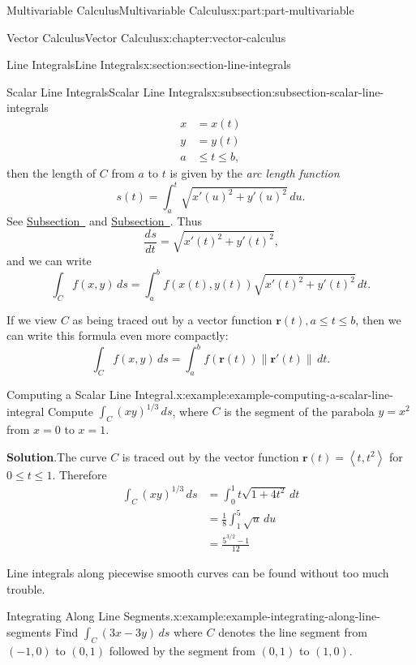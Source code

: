 \documentclass[twoside,10pt,]{book}
\newcommand{\blocktitlefont}{\relax}
\numberwithin{equation}{part}
\newcommand{\vb}[1]{\mathbf{#1}}
\newcommand{\dv}[3][]{\dfrac{d^{#1} #2}{d #3^{#1}}}
\newcommand{\norm}[1]{\left\| #1 \right\|}
\newcommand{\dotprod}[1]{\left\langle #1 \right\rangle}
\newcommand{\amp}{&}
\begin{document}
\begin{partptx}{Multivariable Calculus}{}{Multivariable Calculus}{}{}{x:part:part-multivariable}
\begin{chapterptx}{Vector Calculus}{}{Vector Calculus}{}{}{x:chapter:vector-calculus}
\begin{sectionptx}{Line Integrals}{}{Line Integrals}{}{}{x:section:section-line-integrals}
\begin{subsectionptx}{Scalar Line Integrals}{}{Scalar Line Integrals}{}{}{x:subsection:subsection-scalar-line-integrals}
\begin{align*}
x \amp = x(t) \\
y \amp = y(t) \\
a \amp \leq t\leq b \text{,}
\end{align*}
then the length of \(C\) from \(a\) to \(t\) is given by the \emph{arc length function}%
\begin{equation*}
s(t) = \int_{a}^{t}\sqrt{x'(u)^{2} + y'(u)^{2}}\,du\text{.}
\end{equation*}
See \hyperref[x:subsection:subsection-arc-length-parametric-curves]{Subsection~} and \hyperref[x:subsection:subsection-arc-length]{Subsection~}. Thus%
\begin{equation*}
\dv{s}{t} = \sqrt{x'(t)^{2} + y'(t)^{2}}\text{,}
\end{equation*}
and we can write%
\begin{equation*}
\int_{C}f(x,y)\,ds = \int_{a}^{b}f(x(t),y(t))\sqrt{x'(t)^{2} + y'(t)^{2}}\,dt\text{.}
\end{equation*}
%
\par
If we view \(C\) as being traced out by a vector function \(\vb{r}(t), a\leq t\leq b\), then we can write this formula even more compactly:%
\begin{equation*}
\int_{C}f(x,y)\,ds = \int_{a}^{b}f(\vb{r}(t))\norm{\vb{r}'(t)}\,dt\text{.}
\end{equation*}
%
\begin{example}{Computing a Scalar Line Integral.}{x:example:example-computing-a-scalar-line-integral}%
Compute \(\int_{C}(xy)^{1/3}\,ds\), where \(C\) is the segment of the parabola \(y = x^{2}\) from \(x = 0\) to \(x = 1\).%
\par\smallskip%
\noindent\textbf{\blocktitlefont Solution}.\hypertarget{g:solution:idp105549281346720}{}\quad{}The curve \(C\) is traced out by the vector function \(\vb{r}(t) = \dotprod{t,t^{2}}\) for \(0\leq t\leq 1\). Therefore%
\begin{align*}
\int_{C}(xy)^{1/3}\,ds \amp = \int_{0}^{1} t\sqrt{1 + 4t^{2}}\,dt \\
\amp = \frac{1}{8}\int_{1}^{5}\sqrt{u}\,du \\
\amp = \frac{5^{3/2} - 1}{12} 
\end{align*}
%
\end{example}
Line integrals along piecewise smooth curves can be found without too much trouble.%
\begin{example}{Integrating Along Line Segments.}{x:example:example-integrating-along-line-segments}%
Find \(\int_{C}(3x - 3y)\,ds\) where \(C\) denotes the line segment from \((-1,0)\) to \((0,1)\) followed by the segment from \((0,1)\) to \((1,0)\).%

\end{example}
\end{subsectionptx}
\end{sectionptx}
\end{chapterptx}
\end{partptx}
\end{document}
